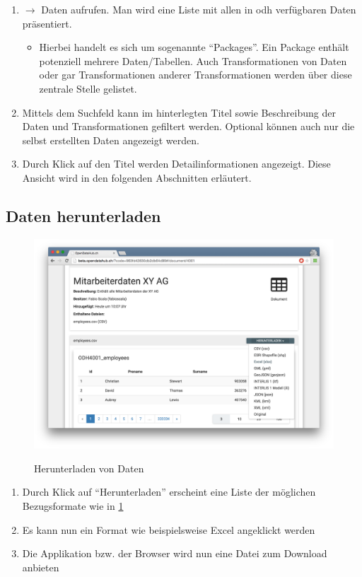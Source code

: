\begin{enumerate}
\item {} $\to$ Daten aufrufen. Man wird eine Liste mit allen in \acl{odh} verfügbaren Daten präsentiert.
	\begin{itemize}
	\item Hierbei handelt es sich um sogenannte ``Packages''. Ein Package enthält potenziell mehrere Daten/Tabellen. Auch Transformationen von Daten oder gar Transformationen anderer Transformationen werden über diese zentrale Stelle gelistet. 
	\end{itemize}
\item Mittels dem Suchfeld kann im hinterlegten Titel sowie Beschreibung der Daten und Transformationen gefiltert werden. Optional können auch nur die selbst erstellten Daten angezeigt werden.
\item Durch Klick auf den Titel werden Detailinformationen angezeigt. Diese Ansicht wird in den folgenden Abschnitten erläutert.
\end{enumerate}


\subsection{Daten herunterladen}

\begin{figure}[H]
	\centering
	\includegraphics[width=\linewidth]{fig/screenshot-daten-herunterladen}
	\label{fig:sd:screenshot-daten-herunterladen}
	\caption{Herunterladen von Daten}
\end{figure}

\begin{enumerate}

\item Durch Klick auf ``Herunterladen'' erscheint eine Liste der möglichen Bezugsformate wie in \cref{fig:sd:screenshot-daten-herunterladen}
\item Es kann nun ein Format wie beispielsweise Excel angeklickt werden
\item Die Applikation bzw. der Browser wird nun eine Datei zum Download anbieten
\end{enumerate}


